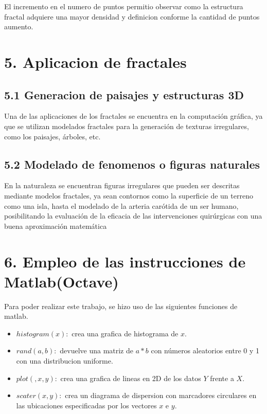 \documentclass[12pt,a4paper]{article}
\begin{document}
El incremento en el numero de puntos permitio observar como la estructura fractal adquiere una mayor densidad y definicion conforme la cantidad de puntos aumento.

\section*{5. Aplicacion de fractales}

\subsection*{5.1 Generacion de paisajes y estructuras 3D}

Una de las aplicaciones de los fractales se encuentra en la computación gráfica, ya que se utilizan modelados fractales para la generación de texturas irregulares, como los paisajes, árboles, etc.

\subsection*{5.2 Modelado de fenomenos o figuras naturales}

En la naturaleza se encuentran figuras irregulares que pueden ser descritas mediante modelos fractales, ya sean contornos como la superficie de un terreno como una isla, hasta el modelado de la arteria carótida de un ser humano, posibilitando la evaluación de la eficacia de las intervenciones quirúrgicas con una buena aproximación matemática

\section*{6. Empleo de las instrucciones de Matlab(Octave)}

Para poder realizar este trabajo, se hizo uso de las siguientes funciones de matlab.

\begin{itemize}
    \item $histogram(x):$ crea una grafica de histograma de $x$.
    \item $rand(a,b):$ devuelve una matriz de $a * b$ con números aleatorios entre 0 y 1 con una distribucion uniforme.
    \item $plot(,x,y):$ crea una grafica de lineas en 2D de los datos $Y$ frente a $X$.
    \item $scater(x,y):$ crea un diagrama de dispersion con marcadores circulares en las ubicaciones especificadas por los vectores $x$ e $y$.
\end{itemize}
\end{document}
